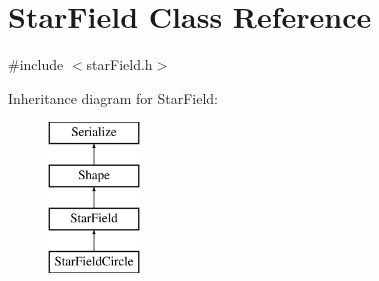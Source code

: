 \hypertarget{classStarField}{\section{Star\-Field Class Reference}
\label{classStarField}
}


{\ttfamily \#include $<$star\-Field.\-h$>$}

Inheritance diagram for Star\-Field\-:\begin{figure}[H]
\begin{center}
\leavevmode
\includegraphics[height=4.000000cm]{classStarField}
\end{center}
\end{figure}
